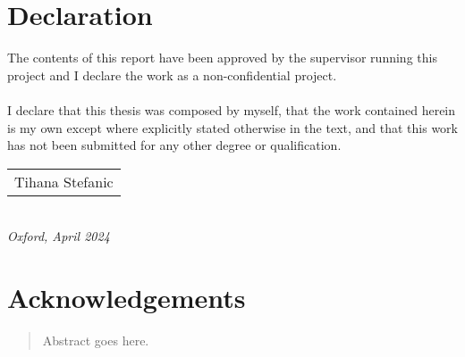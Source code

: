 %

\newpage
\setcounter{page}{1}
\section*{Declaration}
The contents of this report have been approved by the supervisor running this project and I declare the work as a non-confidential project.\\\\
I declare that this thesis was composed by myself, that the work contained herein is my own except where explicitly stated otherwise in the text, and that this work has not been submitted for any other degree or qualification. \\
\bigskip


\begin{flushright}
	\begin{tabular}{m{5cm}}
		\\ \hline
		\centering Tihana Stefanic \\
		
	\end{tabular}\\
	
	\raggedleft\textit{Oxford, April 2024}
\end{flushright}
\newpage

\section*{Acknowledgements}


\newpage

\newpage

\printacronyms[template=description]
\newpage
\begin{abstract}
	Abstract goes here.
\end{abstract}
\newpage
\tableofcontents                                %
\newpage


\listoffigures
\listoftables
\newpage